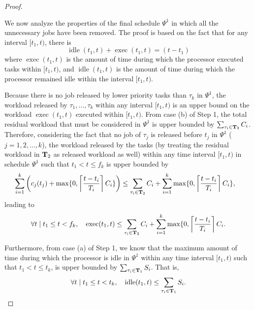 \begin{proof}
~



We now analyze the properties of the final schedule $\Psi^1$ in which all the unnecessary jobs have been removed. The proof is based on the fact that for any interval $[t_1, t)$, there is 
\begin{equation}
\label{eq:exec_plus_idle}
\operatorname{idle}(t_1, t) + \operatorname{exec}(t_1, t)  = (t - t_1)
\end{equation}
where $\operatorname{exec}(t_1, t)$ is the amount of time during which the processor executed tasks within $[t_1, t)$, and $\operatorname{idle}(t_1, t)$ is the amount of time during which the processor remained idle within the interval $[t_1, t)$.

Because there is no job released by lower priority tasks than $\tau_k$ in $\Psi^1$, the workload released by $\tau_1, \ldots, \tau_k$ within any interval $[t_1, t)$ is an upper bound on the workload $\operatorname{exec}(t_1, t)$ executed within $[t_1, t)$. From case (b) of Step 1, the total residual workload that must be considered in $\Psi^1$ is upper bounded by $\sum_{\tau_i \in {\bf T}_2} C_i$.
Therefore, considering the fact that no job of $\tau_j$ is released before $t_j$ in $\Psi^1$ ($j=1,2,\ldots,k$), the workload released by the tasks (by treating the residual workload in ${\bf T}_2$ as released workload as well) within any time interval $[t_1, t)$ in schedule $\Psi^1$ such that $t_1 < t \leq f_k$ is upper bounded by 
\begin{align*}
\sum_{i=1}^k \left( c_j(t_j) + \max\{0, \left\lceil{\frac{t- t_i}{T_i} }\right\rceil C_i \} \right) & \leq \sum_{\tau_i \in {\bf T}_2} C_i + \sum_{i=1}^k \max\{0, \left\lceil{\frac{t- t_i}{T_i} }\right\rceil C_i \},
\end{align*}
leading to 
\begin{equation}
\label{eq:exec_time}
\forall t \mid t_1 \leq t < f_k,\quad \operatorname{exec}(t_1, t) \leq \sum_{\tau_i \in {\bf T}_2} C_i + \sum_{i=1}^k \max\{0, \left\lceil{\frac{t- t_i}{T_i} }\right\rceil C_i.
\end{equation}

Furthermore, from case (a) of Step 1, we know that the maximum amount of time during which the processor is idle in $\Psi^1$ within any time interval $[t_1, t)$ such that $t_1 < t \leq t_k$, is upper bounded by $\sum_{\tau_i \in {\bf T}_1} S_i$. That is,
\begin{equation}
\label{eq:idle_time}
\forall t \mid t_1 \leq t < t_k,\quad \operatorname{idle}(t_1, t) \leq \sum_{\tau_i \in {\bf T}_1} S_i.
\end{equation}


\end{proof}
